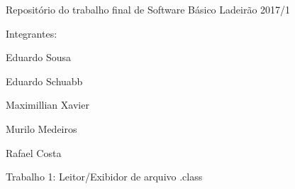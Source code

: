 Repositório do trabalho final de Software Básico Ladeirão 2017/1

Integrantes\+:

Eduardo Sousa

Eduardo Schuabb

Maximillian Xavier

Murilo Medeiros

Rafael Costa

Trabalho 1\+: Leitor/\+Exibidor de arquivo .class 